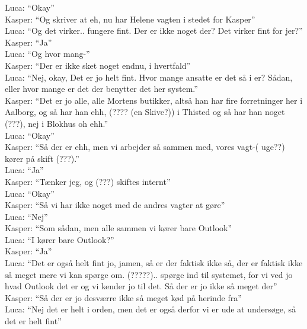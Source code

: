 Luca: “Okay”\\
Kasper: “Og skriver at eh, nu har Helene vagten i stedet for Kasper”\\
Luca: “Og det virker.. fungere fint. Der er ikke noget der? Det virker fint for jer?”\\
Kasper: “Ja”\\
Luca: “Og hvor mang-”\\
Kasper: “Der er ikke sket noget endnu, i hvertfald”\\
Luca: “Nej, okay, Det er jo helt fint. Hvor mange ansatte er det så i er? Sådan, eller hvor mange er det der benytter det her system.”\\
Kasper: “Det er jo alle, alle Mortens butikker, altså han har fire forretninger her i Aalborg, og så har han ehh, (???? (en Skive?)) i Thisted og så har han noget (???), nej i Blokhus oh ehh.”\\
Luca: “Okay”\\
Kasper: “Så der er ehh, men vi arbejder så sammen med, vores vagt-( uge??) kører på skift (???).”\\
Luca: “Ja”\\
Kasper: “Tænker jeg, og (???) skiftes internt”\\
Luca: “Okay”\\
Kasper: “Så vi har ikke noget med de andres vagter at gøre”\\
Luca: “Nej”\\
Kasper: “Som sådan, men alle sammen vi kører bare Outlook”\\
Luca: “I kører bare Outlook?”\\
Kasper: “Ja”\\
Luca: “Det er også helt fint jo, jamen, så er der faktisk ikke så, der er faktisk ikke så meget mere vi kan spørge om. (?????).. spørge ind til systemet, for vi ved jo hvad Outlook det er og vi kender jo til det. Så der er jo ikke så meget der”\\
Kasper: “Så der er jo desværre ikke så meget kød på herinde fra”\\
Luca: “Nej det er helt i orden, men det er også derfor vi er ude at undersøge, så det er helt fint”\\

